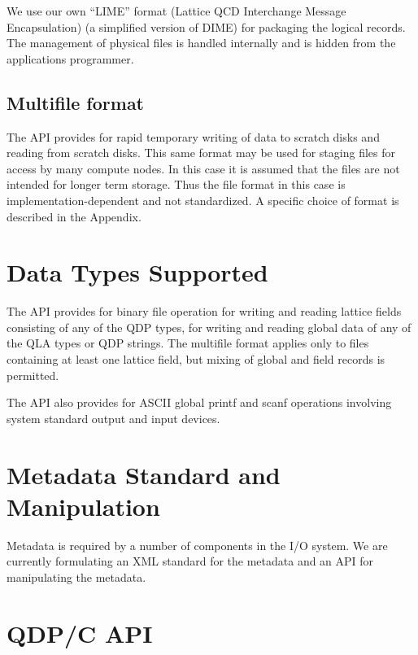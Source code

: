 \documentclass{article}
\begin{document}
We use our own ``LIME'' format (Lattice QCD Interchange Message
Encapsulation) (a simplified version of DIME) for packaging the
logical records.  The management of physical files is handled
internally and is hidden from the applications programmer.

\subsection{Multifile format}

The API provides for rapid temporary writing of data to scratch disks
and reading from scratch disks.  This same format may be used for
staging files for access by many compute nodes.  In this case it is
assumed that the files are not intended for longer term storage.  Thus
the file format in this case is implementation-dependent and not
standardized.  A specific choice of format is described in the
Appendix.

\section{Data Types Supported}

The API provides for binary file operation for writing and reading
lattice fields consisting of any of the QDP types, for writing and
reading global data of any of the QLA types or QDP strings.  The
multifile format applies only to files containing at least one lattice
field, but mixing of global and field records is permitted.

The API also provides for ASCII global printf and scanf operations
involving system standard output and input devices.

\section{Metadata Standard and Manipulation}

Metadata is required by a number of components in the I/O system.  We
are currently formulating an XML standard for the metadata and an API
for manipulating the metadata.

\section{QDP/C API}
\end{document}
